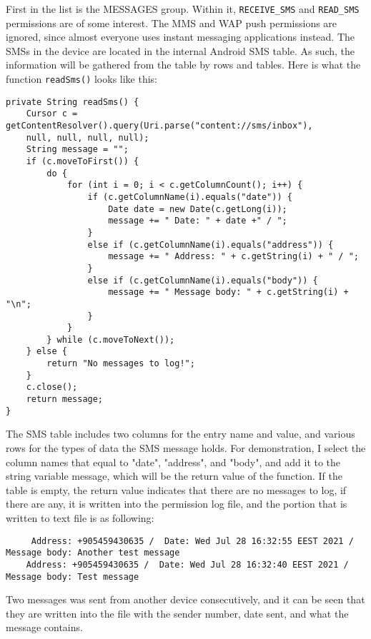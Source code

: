 \documentclass[
  a4paper,  %
  twoside,  %
  bibliography=totoc,
  headsepline,
  cleardoublepage=empty,
  parskip=half,
  draft=false,
  open=any
]{scrbook}
\begin{document}
First in the list is the MESSAGES group. Within it, \texttt{RECEIVE\_SMS} and \texttt{READ\_SMS} permissions are of some interest. The MMS and WAP push permissions are ignored, since almost everyone uses instant messaging applications instead. The SMSs in the device are located in the internal Android SMS table. As such, the information will be gathered from the table by rows and tables. Here is what the function \texttt{readSms()} looks like this:
\begin{lstlisting}
private String readSms() {
	Cursor c = getContentResolver().query(Uri.parse("content://sms/inbox"),
	null, null, null, null);
	String message = "";
	if (c.moveToFirst()) {
		do {
			for (int i = 0; i < c.getColumnCount(); i++) {
				if (c.getColumnName(i).equals("date")) {
					Date date = new Date(c.getLong(i));
					message += " Date: " + date +" / ";
				}
				else if (c.getColumnName(i).equals("address")) {
					message += " Address: " + c.getString(i) + " / ";
				}
				else if (c.getColumnName(i).equals("body")) {
					message += " Message body: " + c.getString(i) + "\n";
				}
			}
		} while (c.moveToNext());
	} else {
		return "No messages to log!";
	}
	c.close();
	return message;
}
\end{lstlisting}
The SMS table includes two columns for the entry name and value, and various rows for the types of data the SMS message holds. For demonstration, I select the column names that equal to "date", "address", and "body", and add it to the string variable message, which will be the return value of the function. If the table is empty, the return value indicates that there are no messages to log, if there are any, it is written into the permission log file, and the portion that is written to text file is as following:
\begin{lstlisting}
	 Address: +905459430635 /  Date: Wed Jul 28 16:32:55 EEST 2021 /  Message body: Another test message
	Address: +905459430635 /  Date: Wed Jul 28 16:32:40 EEST 2021 /  Message body: Test message
\end{lstlisting}
Two messages was sent from another device consecutively, and it can be seen that they are written into the file with the sender number, date sent, and what the message contains. 
\end{document}
